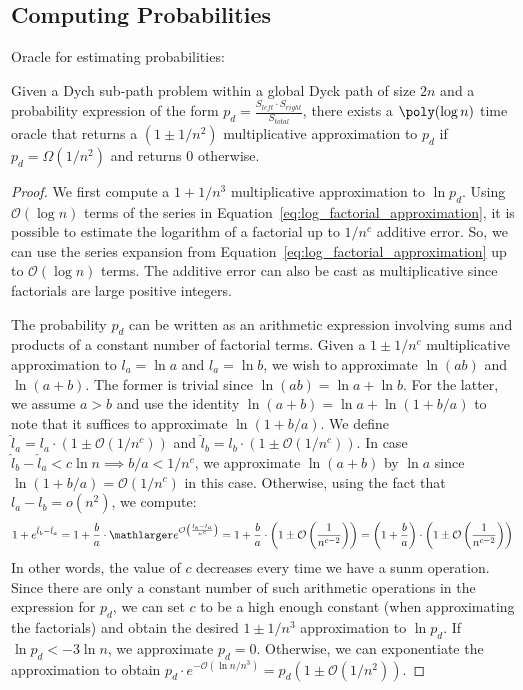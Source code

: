 \subsection{Computing Probabilities}%
\label{sec:computing_probabilities}
Oracle for estimating probabilities:
\begin{lemma}
\label{lem:probability_approximation_oracle}
Given a Dych sub-path problem within a global Dyck path of size $2n$ and a probability expression of the form
$p_d = \frac{S_{left}\cdot S_{right}}{S_{total}}$, there exists a $\poly(\log n)$ time oracle that returns a
$\left( 1\pm 1/n^2\right)$ multiplicative approximation to $p_d$ if $p_d = \Omega(1/n^2)$ and returns $0$ otherwise.
\end{lemma}
\begin{proof}
We first compute a $1+1/n^3$ multiplicative approximation to $\ln p_d$.
Using $\mathcal O(\log n)$ terms of the series in Equation~\ref{eq:log_factorial_approximation},
it is possible to estimate the logarithm of a factorial up to $1/n^c$ additive error.
So, we can use the series expansion from Equation~\ref{eq:log_factorial_approximation} up to $\mathcal O(\log n)$ terms.
The additive error can also be cast as multiplicative since factorials are large positive integers.

The probability $p_d$ can be written as an arithmetic expression involving sums and products of a constant number of factorial terms.
Given a $1\pm1/n^c$ multiplicative approximation to $l_a = \ln a$ and $l_a = \ln b$, we wish to approximate $\ln(ab)$ and $\ln(a+b)$.
The former is trivial since $\ln(ab) = \ln a + \ln b$.
For the latter, we assume $a>b$ and use the identity $\ln(a+b) = \ln a + \ln(1+b/a)$ to note that it suffices to approximate $\ln(1+b/a)$.
We define $\hat l_a = l_a\cdot(1\pm \mathcal O(1/n^c))$ and $\hat l_b = l_b\cdot(1\pm \mathcal O(1/n^c))$.
In case $\hat l_b-\hat l_a <c\ln n\implies b/a < 1/n^c$, we approximate $\ln(a+b)$ by $\ln a$ since $\ln(1+b/a) = \mathcal O(1/n^c)$ in this case.
Otherwise, using the fact that $l_a-l_b = o(n^2)$, we compute:
\[
1+e^{\hat l_b-\hat l_a} = 1+\frac ba\cdot \mathlarger e^{\mathcal O\left( \frac{l_b-l_a}{n^c}\right)}
= 1+\frac ba\cdot\left( 1 \pm \mathcal O\left( \frac{1}{n^{c-2}} \right)\right)
= \left( 1+\frac ba\right)\cdot\left( 1 \pm \mathcal O\left( \frac{1}{n^{c-2}} \right)\right)
\]
In other words, the value of $c$ decreases every time we have a sunm operation.
Since there are only a constant number of such arithmetic operations in the expression for $p_d$,
we can set $c$ to be a high enough constant (when approximating the factorials) and obtain the desired $1\pm1/n^3$ approximation to $\ln p_d$.
If $\ln p_d < -3\ln n$, we approximate $p_d = 0$.
Otherwise, we can exponentiate the approximation to obtain $p_d\cdot e^{-\mathcal O(\ln n/n^3)} = p_d\left( 1 \pm \mathcal O(1/n^2)\right)$.
\end{proof}



